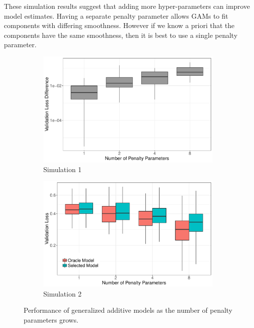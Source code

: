 \documentclass[12pt]{article} %
\theoremstyle{definition}
\begin{document}
These simulation results suggest that adding more hyper-parameters can improve model estimates.
Having a separate penalty parameter allows GAMs to fit components with differing smoothness.
However if we know a priori that the components have the same smoothness, then it is best to use a single penalty parameter.

\begin{figure}
	\centering
	\begin{subfigure}{0.48\textwidth}
		\includegraphics[width=\textwidth]{../../../R/figures/validation_size_loss_diff_homogeneous.pdf}
		\caption{Simulation 1}
	\end{subfigure}
	\begin{subfigure}{0.48\textwidth}
		\includegraphics[width=\textwidth]{../../../R/figures/validation_size_loss_heterogeneous.pdf}
		\caption{Simulation 2}
	\end{subfigure}
	\caption{
		Performance of generalized additive models as the number of penalty parameters grows.
	}
	\label{fig:simulations}
\end{figure}
\end{document}
